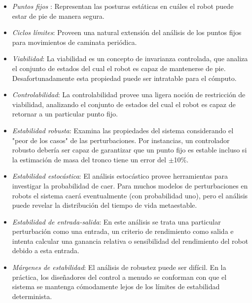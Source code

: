 \documentclass{book}
\begin{document}
\begin{itemize}
\item \textit{Puntos fijos} : Representan las posturas estáticas en cuáles el robot puede estar de pie de manera segura.

\item \textit{Ciclos límites}: Proveen una natural extensión del análisis de los puntos fijos para movimientos de caminata periódica.

\item \textit{Viabilidad}: La viabilidad es un concepto de invarianza controlada, que analiza el conjunto de estados del cual el robot es capaz de mantenerse de pie. Desafortunadamente esta propiedad puede ser intratable para el cómputo.

\item \textit{Controlabilidad}: La controlabilidad provee una ligera noción de restricción de viabilidad, analizando el conjunto de estados del cual el robot es capaz de retornar a un particular punto fijo.

\item \textit{Estabilidad robusta}: Examina las propiedades del sistema considerando el "peor de los casos" de las perturbaciones. Por instancias, un controlador robusto debería ser capaz de garantizar que un punto fijo es estable incluso si la estimación de masa del tronco tiene un error del $\pm$10\%.

\item \textit{Estabilidad estocástica}: El análisis estocástico provee herramientas para investigar la probabilidad de caer. Para muchos modelos de perturbaciones en robots el sistema caerá eventualmente (con probabilidad uno), pero el análisis puede revelar la distribución del tiempo de vida metaestable.

\item \textit{Estabilidad de entrada-salida}: En este análisis se trata una particular perturbación como una entrada, un criterio de rendimiento como salida e intenta calcular una ganancia relativa o sensibilidad del rendimiento del robot debido a esta entrada.

\item \textit{Márgenes de estabilidad}: El análisis de robustez puede ser difícil. En la práctica, los diseñadores del control a menudo se conforman con que el sistema se mantenga cómodamente lejos de los límites de estabilidad determinista.		

\end{itemize}
\end{document}
